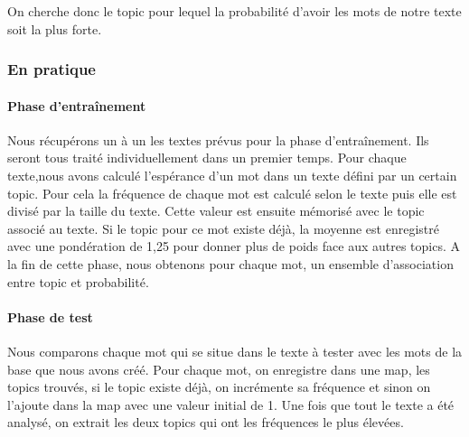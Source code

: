 On cherche donc le topic pour lequel la probabilité d'avoir les mots de notre texte soit la plus forte.


\subsubsection{En pratique}
\paragraph{Phase d'entraînement}  Nous récupérons un à un les textes prévus pour la phase d'entraînement. Ils seront tous traité individuellement dans un premier temps. Pour chaque texte,nous avons calculé l'espérance d'un mot dans un texte défini par un certain topic. Pour cela la fréquence de chaque mot est calculé selon le texte puis elle est divisé par la taille du texte. Cette valeur est ensuite mémorisé avec le topic associé au texte. Si le topic pour ce mot existe déjà, la moyenne est enregistré avec une pondération de 1,25 pour donner plus de poids face aux autres topics. A la fin de cette phase, nous obtenons pour chaque mot, un ensemble d'association entre topic et probabilité. 


\paragraph{Phase de test}  Nous comparons chaque mot qui se situe dans le texte à tester avec les mots de la base que nous avons créé. Pour chaque mot, on enregistre dans une map, les topics trouvés, si le topic existe déjà, on incrémente sa fréquence et sinon on l'ajoute dans la map avec une valeur initial de 1. Une fois que tout le texte a été analysé, on extrait les deux topics qui ont les fréquences le plus élevées.
